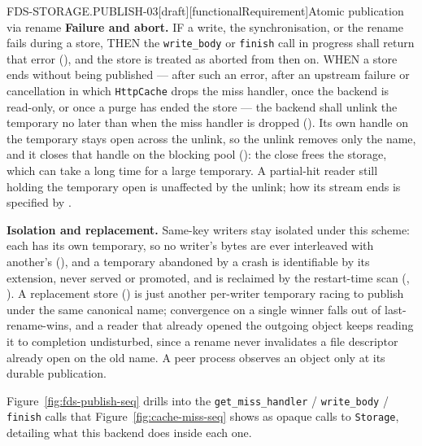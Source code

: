 \begin{requirement}{FDS-STORAGE.PUBLISH-03}[draft][functionalRequirement]{Atomic publication via rename}
  \textbf{Failure and abort.} IF a write, the synchronisation, or the rename
  fails during a store, THEN the \texttt{write\_body} or \texttt{finish} call
  in progress shall return that error (), and
  the store is treated as aborted from then on. WHEN a store ends without
  being published --- after such an error, after an upstream failure or
  cancellation in which \texttt{HttpCache} drops the miss handler, once the
  backend is read-only, or once a purge has ended the store --- the backend
  shall unlink the temporary no later than when the
  miss handler is dropped (). Its own handle
  on the temporary stays open across the unlink, so the unlink removes only
  the name, and it closes that handle on the blocking pool
  (): the close frees the storage, which
  can take a long time for a large temporary. A partial-hit
  reader still holding the temporary open is unaffected by the unlink; how its
  stream ends is specified by .

  \textbf{Isolation and replacement.} Same-key writers stay isolated under
  this scheme: each has its own temporary, so no writer's bytes are ever
  interleaved with another's (), and a
  temporary abandoned by a crash is identifiable by its extension, never
  served or promoted, and is reclaimed by the restart-time scan
  (, ). A
  replacement store () is just another
  per-writer temporary racing to publish under the same canonical name;
  convergence on a single winner falls out of last-rename-wins, and a reader
  that already opened the outgoing object keeps reading it to completion
  undisturbed, since a rename never invalidates a file descriptor already
  open on the old name. A peer process observes an object only at its
  durable publication.

  Figure~\ref{fig:fds-publish-seq} drills into the \texttt{get\_miss\_handler}
  / \texttt{write\_body} / \texttt{finish} calls that Figure~\ref{fig:cache-miss-seq}
  shows as opaque calls to \texttt{Storage}, detailing what this backend does
  inside each one.


\end{requirement}
